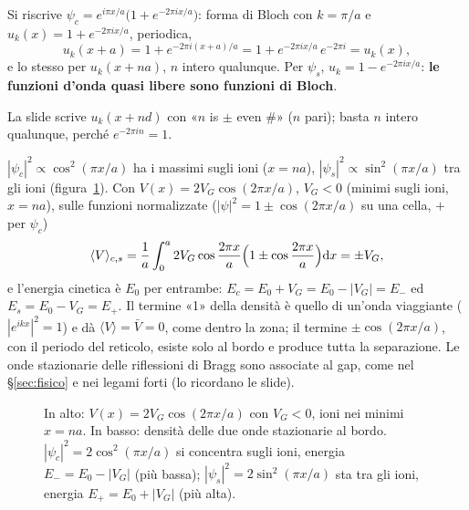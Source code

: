 \documentclass[11pt,a4paper]{article}
\begin{document}
Si riscrive $\psi_c=e^{i\pi x/a}\bigl(1+e^{-2\pi ix/a}\bigr)$: forma di Bloch con $k=\pi/a$ e $u_k(x)=1+e^{-2\pi ix/a}$, periodica,
\[
u_k(x+a)=1+e^{-2\pi i(x+a)/a}=1+e^{-2\pi ix/a}\,e^{-2\pi i}=u_k(x),
\]
e lo stesso per $u_k(x+na)$, $n$ intero qualunque. Per $\psi_s$, $u_k=1-e^{-2\pi ix/a}$: \textbf{le funzioni d'onda quasi libere sono funzioni di Bloch}.
\begin{osservazione}
La slide scrive $u_k(x+nd)$ con «$n$ is $\pm$ even \#» ($n$ pari); basta $n$ intero qualunque, perché $e^{-2\pi in}=1$.
\end{osservazione}

$|\psi_c|^2\propto\cos^2(\pi x/a)$ ha i massimi sugli ioni ($x=na$), $|\psi_s|^2\propto\sin^2(\pi x/a)$ tra gli ioni (figura~\ref{fig:qfonde}). Con $V(x)=2V_G\cos(2\pi x/a)$, $V_G<0$ (minimi sugli ioni, $x=na$),
sulle funzioni normalizzate ($|\psi|^2=1\pm\cos(2\pi x/a)$ su una cella, $+$ per $\psi_c$)
\[
\langle V\rangle_{c,s}=\frac1a\int_0^a2V_G\cos\frac{2\pi x}a\Bigl(1\pm\cos\frac{2\pi x}a\Bigr)\mathrm d x=\pm V_G ,
\]
e l'energia cinetica è $E_0$ per entrambe: $E_c=E_0+V_G=E_0-|V_G|=E_-$ ed $E_s=E_0-V_G=E_+$. Il termine «1» della densità è quello di un'onda viaggiante ($|e^{ikx}|^2=1$)
e dà $\langle V\rangle=\bar V=0$, come dentro la zona; il termine $\pm\cos(2\pi x/a)$, con il periodo del reticolo, esiste solo al bordo e produce tutta la separazione. Le onde stazionarie delle
riflessioni di Bragg sono associate al gap, come nel §\ref{sec:fisico} e nei legami forti (lo ricordano le slide).

\begin{figure}[tbp]
\centering
{}
\caption{In alto: $V(x)=2V_G\cos(2\pi x/a)$ con $V_G<0$, ioni nei minimi $x=na$. In basso: densità delle due onde stazionarie al bordo. $|\psi_c|^2=2\cos^2(\pi x/a)$ si concentra sugli ioni, energia $E_-=E_0-|V_G|$ (più bassa);
$|\psi_s|^2=2\sin^2(\pi x/a)$ sta tra gli ioni, energia $E_+=E_0+|V_G|$ (più alta).}\label{fig:qfonde}
\end{figure}
\end{document}
